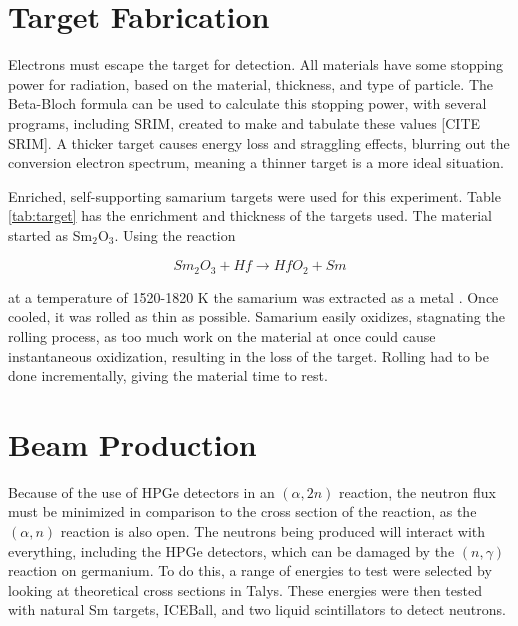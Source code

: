 

\section{Target Fabrication}

Electrons must escape the target for detection. All materials have some stopping power for radiation, based on the material, thickness, and type of particle. The Beta-Bloch formula can be used to calculate this stopping power, with several programs, including SRIM, created to make and tabulate these values [CITE SRIM]. A thicker target causes energy loss and straggling effects, blurring out the conversion electron spectrum, meaning a thinner target is a more ideal situation.

Enriched, self-supporting samarium targets were used for this experiment. Table \ref{tab:target} has the enrichment and thickness of the targets used. The material started as Sm$_2$O$_3$. Using the reaction

\begin{equation}
    Sm_2O_3 + Hf \xrightarrow{} HfO_2 + Sm
    \label{eq:sm_hf}
\end{equation}

at a temperature of 1520-1820 K the samarium was extracted as a metal \citep{clifford02:_target}. Once cooled, it was rolled as thin as possible. Samarium easily oxidizes, stagnating the rolling process, as too much work on the material at once could cause instantaneous oxidization, resulting in the loss of the target. Rolling had to be done incrementally, giving the material time to rest.



\section{Beam Production}

Because of the use of HPGe detectors in an $(\alpha,2n)$ reaction, the neutron flux must be minimized in comparison to the cross section of the reaction, as the $(\alpha,n)$ reaction is also open. The neutrons being produced will interact with everything, including the HPGe detectors, which can be damaged by the $(n,\gamma)$ reaction on germanium. To do this, a range of energies to test were selected by looking at theoretical cross sections in Talys\citep{koning07:_talys}. These energies were then tested with natural Sm targets, ICEBall, and two liquid scintillators to detect neutrons.

